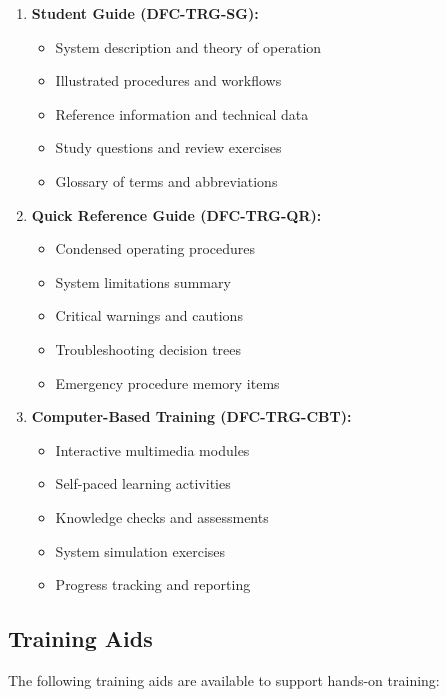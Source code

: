 \documentclass[12pt,a4paper,twoside,openright]{book}
\begin{document}
\begin{enumerate}
    \item \textbf{Student Guide (DFC-TRG-SG):}
    \begin{itemize}
        \item System description and theory of operation
        \item Illustrated procedures and workflows
        \item Reference information and technical data
        \item Study questions and review exercises
        \item Glossary of terms and abbreviations
    \end{itemize}
    
    \item \textbf{Quick Reference Guide (DFC-TRG-QR):}
    \begin{itemize}
        \item Condensed operating procedures
        \item System limitations summary
        \item Critical warnings and cautions
        \item Troubleshooting decision trees
        \item Emergency procedure memory items
    \end{itemize}
    
    \item \textbf{Computer-Based Training (DFC-TRG-CBT):}
    \begin{itemize}
        \item Interactive multimedia modules
        \item Self-paced learning activities
        \item Knowledge checks and assessments
        \item System simulation exercises
        \item Progress tracking and reporting
    \end{itemize}
\end{enumerate}

\subsection{Training Aids}

The following training aids are available to support hands-on training:
\end{document}
